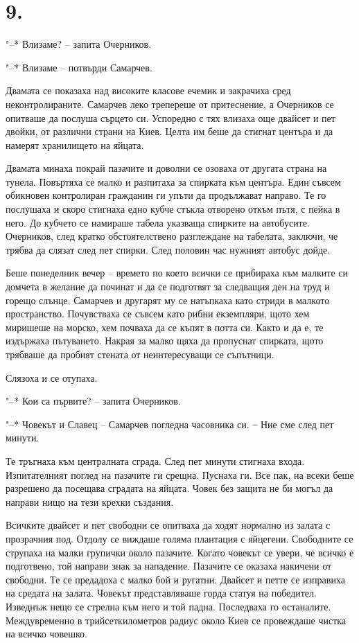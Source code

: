 \documentclass[ebook,openany,12pt]{memoir}
\begin{document}
\section*{9.}

"--* Влизаме? – запита Очерников.

"--* Влизаме – потвърди Самарчев.

Двамата се показаха над високите класове ечемик и закрачиха сред неконтролираните. Самарчев леко трепереше от притеснение, а Очерников се опитваше да послуша сърцето си. Успоредно с тях влизаха още двайсет и пет двойки, от различни страни на Киев. Целта им беше да стигнат центъра и да намерят хранилището на яйцата.

Двамата минаха покрай пазачите и доволни се озоваха от другата страна на тунела. Повъртяха се малко и разпитаха за спирката към центъра. Един съвсем обикновен контролиран гражданин ги упъти да продължават направо. Те го послушаха и скоро стигнаха едно кубче стъкла отворено откъм пътя, с пейка в него. До кубчето се намираше табела указваща спирките на автобусите. Очерников, след кратко обстоятелствено разглеждане на табелата, заключи, че трябва да слязат след пет спирки. След половин час нужният автобус дойде.

Беше понеделник вечер – времето по което всички се прибираха към малките си домчета в желание да починат и да се подготвят за следващия ден на труд и горещо слънце. Самарчев и другарят му се натъпкаха като стриди в малкото пространство. Почувстваха се съвсем като рибни екземпляри, щото хем миришеше на морско, хем почваха да се къпят в потта си. Както и да е, те издържаха пътуването. Накрая за малко щяха да пропуснат спирката, щото трябваше да пробият стената от неинтересуващи се съпътници.

Слязоха и се отупаха.

"--* Кои са първите? – запита Очерников.

"--* Човекът и Славец -- Самарчев погледна часовника си. – Ние сме след пет минути.

Те тръгнаха към централната сграда. След пет минути стигнаха входа. Изпитателният поглед на пазачите ги срещна. Пуснаха ги. Все пак, на всеки беше разрешено да посещава сградата на яйцата. Човек без защита не би могъл да направи нищо на тези крехки създания. 

Всичките двайсет и пет свободни се опитваха да ходят нормално из залата с прозрачния под. Отдолу се виждаше голяма плантация с яйцегени. Свободните се струпаха на малки групички около пазачите. Когато човекът се увери, че всичко е подготвено, той направи знак за нападение. Пазачите се оказаха накичени от свободни. Те се предадоха с малко бой и ругатни. Двайсет и петте се изправиха на средата на залата. Човекът представляваше горда статуя на победител. Изведнъж нещо се стрелна към него и той падна. Последваха го останалите. Междувременно в трийсеткилометров радиус около Киев се провеждаше чистка на всичко човешко.
\end{document}
